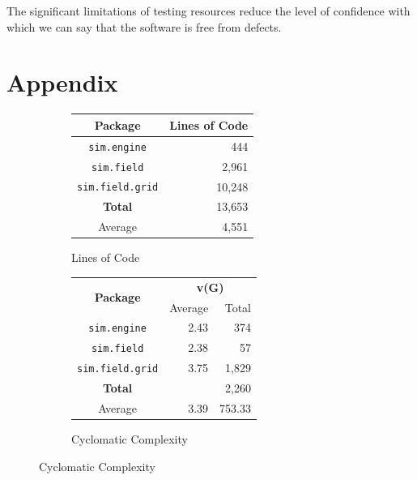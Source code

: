 \documentclass[11pt]{article}
\begin{document}
The significant limitations of testing resources reduce the level of confidence with which we can say that the software is free from defects.


\newpage
\raggedright
{}

\newpage
\section{Appendix}


\begin{figure}[htp]
\begin{subfigure}[b]{\textwidth}
\begin{center}
\begin{tabular}{|c|r|}
	\hline
	\textbf{Package} & \textbf{Lines of Code} \\
	\hline
	\texttt{sim.engine} & 444 \\
	\texttt{sim.field} & 2,961 \\
	\texttt{sim.field.grid} & 10,248 \\
	\hline
	\textbf{Total} & 13,653 \\
	\hline
	Average & 4,551 \\
	\hline
\end{tabular}
\end{center}
\caption{Lines of Code}
\label{fig:loc}
\end{subfigure}

\par\bigskip

\begin{subfigure}[b]{\textwidth}
\begin{center}
\begin{tabular}{|c|r|r|}
	\hline
	\multirow{2}{4em}{\textbf{Package}} & \multicolumn{2}{|c|}{\textbf{v(G)}} \\
	\cline{2-3}
	& Average & Total \\
	\hline
	\texttt{sim.engine} & 2.43 & 374 \\
	\texttt{sim.field} & 2.38 & 57 \\
	\texttt{sim.field.grid} & 3.75 & 1,829 \\
	\hline
	\textbf{Total} && 2,260 \\
	\hline
	Average & 3.39 & 753.33 \\
	\hline
\end{tabular}
\end{center}
\caption{Cyclomatic Complexity}
\label{fig:cc}
\end{subfigure}


\end{figure}
\end{document}
